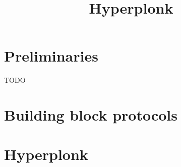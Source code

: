 \documentclass[a4paper,10pt]{llncs}
\title{Hyperplonk}
\author{}
\institute{}
\begin{document}
\setlength{\parskip}{0pt}

\maketitle


\section{Preliminaries}
TODO

\section{Building block protocols}


\section{Hyperplonk}
 

\clearpage


\end{document}
